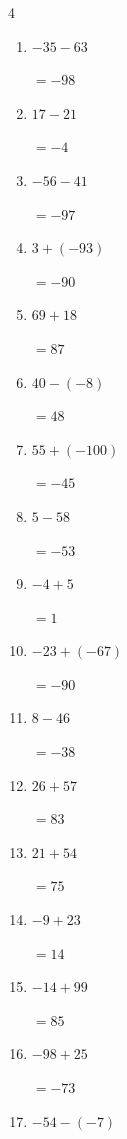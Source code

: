 \begin{multicols}{4}
\begin{enumerate}
        $=-13$

  \item $-35-63$

        $=-98$

  \item $17-21$

        $=-4$

  \item $-56-41$

        $=-97$

  \item $3+(-93)$

        $=-90$

  \item $69+18$

        $=87$

  \item $40-(-8)$

        $=48$

  \item $55+(-100)$

        $=-45$

  \item $5-58$

        $=-53$

  \item $-4+5$

        $=1$

\columnbreak %

  \item $-23+(-67)$

        $=-90$

  \item $8-46$

        $=-38$

  \item $26+57$

        $=83$

  \item $21+54$

        $=75$

  \item $-9+23$

        $=14$

  \item $-14+99$

        $=85$

  \item $-98+25$

        $=-73$

  \item $-54-(-7)$


\end{enumerate}
\end{multicols}
